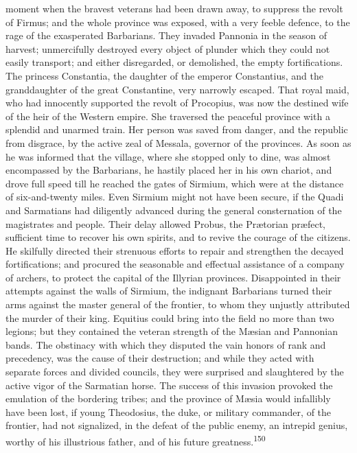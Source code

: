 moment when the bravest veterans had been drawn away, to suppress
the revolt of Firmus; and the whole province was exposed, with a
very feeble defence, to the rage of the exasperated Barbarians.
They invaded Pannonia in the season of harvest; unmercifully
destroyed every object of plunder which they could not easily
transport; and either disregarded, or demolished, the empty
fortifications. The princess Constantia, the daughter of the
emperor Constantius, and the granddaughter of the great
Constantine, very narrowly escaped. That royal maid, who had
innocently supported the revolt of Procopius, was now the
destined wife of the heir of the Western empire. She traversed
the peaceful province with a splendid and unarmed train. Her
person was saved from danger, and the republic from disgrace, by
the active zeal of Messala, governor of the provinces. As soon as
he was informed that the village, where she stopped only to dine,
was almost encompassed by the Barbarians, he hastily placed her
in his own chariot, and drove full speed till he reached the
gates of Sirmium, which were at the distance of six-and-twenty
miles. Even Sirmium might not have been secure, if the Quadi and
Sarmatians had diligently advanced during the general
consternation of the magistrates and people. Their delay allowed
Probus, the Prætorian præfect, sufficient time to recover his own
spirits, and to revive the courage of the citizens. He skilfully
directed their strenuous efforts to repair and strengthen the
decayed fortifications; and procured the seasonable and effectual
assistance of a company of archers, to protect the capital of the
Illyrian provinces. Disappointed in their attempts against the
walls of Sirmium, the indignant Barbarians turned their arms
against the master general of the frontier, to whom they unjustly
attributed the murder of their king. Equitius could bring into
the field no more than two legions; but they contained the
veteran strength of the Mæsian and Pannonian bands. The obstinacy
with which they disputed the vain honors of rank and precedency,
was the cause of their destruction; and while they acted with
separate forces and divided councils, they were surprised and
slaughtered by the active vigor of the Sarmatian horse. The
success of this invasion provoked the emulation of the bordering
tribes; and the province of Mæsia would infallibly have been
lost, if young Theodosius, the duke, or military commander, of
the frontier, had not signalized, in the defeat of the public
enemy, an intrepid genius, worthy of his illustrious father, and
of his future greatness.\textsuperscript{150}

